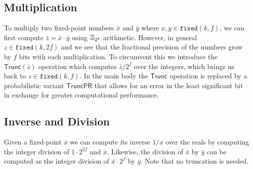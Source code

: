 \subsection{Multiplication}
To multiply two fixed-point numbers $\bar{x}$ and $\bar{y}$ where $x, y \in \mathtt{fixed}(k, f)$, we can first compute $\bar{z} = \bar{x} \cdot \bar{y}$ using $\mathbb{Z}_{2^k}$ arithmetic. However, in general $z \in \mathtt{fixed}(k, 2f)$ and we see that the fractional precision of the numbers grow by $f$ bits with each multiplication. To circumvent this we introduce the $\mathsf{Trunc}(\bar{z})$ operation which computes $\bar{z} / 2^{f}$ over the integers, which brings us back to $z \in \mathtt{fixed}(k, f)$. In the main body the $\mathsf{Trunc}$ operation is replaced by a probabilistic variant $\mathsf{TruncPR}$ that allows for an error in the least significant bit in exchange for greater computational performance.






\subsection{Inverse and Division}

Given a fixed-point $\bar{x}$ we can compute its inverse $1/x$ over the reals by computing the integer division of $1 \cdot 2^{2f}$ and $\bar{x}$. Likewise, the division of $\bar{x}$ by $\bar{y}$ can be computed as the integer division of $\bar{x} \cdot 2^f$ by $\bar{y}$. Note that no truncation is needed.
